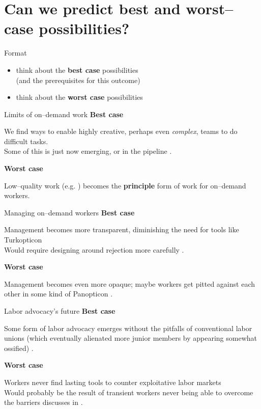 \documentclass{beamer}
\begin{document}
\section{Can we predict best and worst--case possibilities?}

\begin{frame}{Format}
  \begin{itemize}
    \item think about the \textbf{best case} possibilities
    \\(and the prerequisites for this outcome)
    \item think about the \textbf{worst case} possibilities
  \end{itemize}
\end{frame}

\begin{frame}{Limits of on--demand work}
  \textbf{Best case}

  We find ways to enable highly creative, perhaps even \textit{complex}, teams to do difficult tasks.
  \\Some of this is just now emerging, or in the pipeline
  \cite[see][also more of Niloufar's work]{foundry,suzukiAtelier}.

  \textbf{Worst case}

  Low--quality work (e.g. \cite{jonBrelig}) becomes the \textbf{principle} form of work for on--demand workers.
\end{frame}

\begin{frame}{Managing on--demand workers}
\textbf{Best case}

Management becomes more transparent, diminishing the need for tools like Turkopticon
\\Would require designing around rejection more carefully
\cite{takingAHITMcInnis}.

\textbf{Worst case}

Management becomes even more opaque;
maybe workers get pitted against each other in some kind of Panopticon
\cite{foucault1977discipline}.

\end{frame}

\begin{frame}{Labor advocacy's future}
\textbf{Best case}

Some form of labor advocacy emerges without the pitfalls of conventional labor unions
(which eventually alienated more junior members by appearing somewhat ossified)
\cite{ahlquist2013interest}.


\textbf{Worst case}

Workers never find lasting tools to counter exploitative labor markets
\\Would probably be the result of transient workers never being able to overcome
the barriers \citeauthor{mccallum2013global} discusses in
\cite{mccallum2013global}.
\end{frame}
\end{document}
